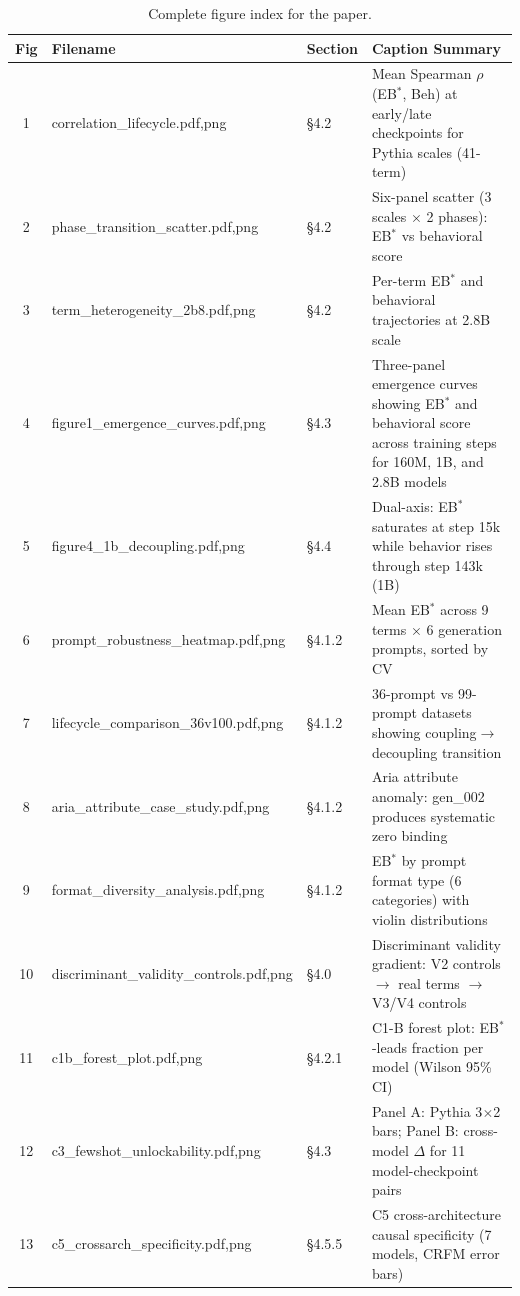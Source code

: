 \documentclass[10pt]{article} %
\begin{document}
\begin{table}[H]
\centering
\scriptsize
\begin{tabular}{|c|l|l|p{6cm}|}
\hline
\textbf{Fig} & \textbf{Filename} & \textbf{Section} & \textbf{Caption Summary} \\
\hline
1 & correlation\_lifecycle.{pdf,png} & \S4.2 & Mean Spearman $\rho$(EB$^*$, Beh) at early/late checkpoints for Pythia scales (41-term) \\
2 & phase\_transition\_scatter.{pdf,png} & \S4.2 & Six-panel scatter (3 scales $\times$ 2 phases): EB$^*$ vs behavioral score \\
3 & term\_heterogeneity\_2b8.{pdf,png} & \S4.2 & Per-term EB$^*$ and behavioral trajectories at 2.8B scale \\
4 & figure1\_emergence\_curves.{pdf,png} & \S4.3 & Three-panel emergence curves showing EB$^*$ and behavioral score across training steps for 160M, 1B, and 2.8B models \\
5 & figure4\_1b\_decoupling.{pdf,png} & \S4.4 & Dual-axis: EB$^*$ saturates at step 15k while behavior rises through step 143k (1B) \\
6 & prompt\_robustness\_heatmap.{pdf,png} & \S4.1.2 & Mean EB$^*$ across 9 terms $\times$ 6 generation prompts, sorted by CV \\
7 & lifecycle\_comparison\_36v100.{pdf,png} & \S4.1.2 & 36-prompt vs 99-prompt datasets showing coupling$\to$decoupling transition \\
8 & aria\_attribute\_case\_study.{pdf,png} & \S4.1.2 & Aria attribute anomaly: gen\_002 produces systematic zero binding \\
9 & format\_diversity\_analysis.{pdf,png} & \S4.1.2 & EB$^*$ by prompt format type (6 categories) with violin distributions \\
10 & discriminant\_validity\_controls.{pdf,png} & \S4.0 & Discriminant validity gradient: V2 controls $\to$ real terms $\to$ V3/V4 controls \\
11 & c1b\_forest\_plot.{pdf,png} & \S4.2.1 & C1-B forest plot: EB$^*$-leads fraction per model (Wilson 95\% CI) \\
12 & c3\_fewshot\_unlockability.{pdf,png} & \S4.3 & Panel A: Pythia 3$\times$2 bars; Panel B: cross-model $\Delta$ for 11 model-checkpoint pairs \\
13 & c5\_crossarch\_specificity.{pdf,png} & \S4.5.5 & C5 cross-architecture causal specificity (7 models, CRFM error bars) \\
\hline
\end{tabular}
\caption{Complete figure index for the paper.}
\end{table}
\end{document}
